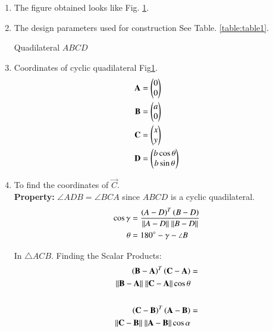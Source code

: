 \renewcommand{\theequation}{\theenumi}
\begin{enumerate}[label=\thesection.\arabic*.,ref=\thesection.\theenumi]

\begin{figure}[!ht]
\centering
\resizebox{\columnwidth}{!}{}
\caption{Cyclic quadilateral by Latex-Tikz}
\label{fig:cyclic_quad}	
\end{figure}

\item The figure obtained looks like Fig. \ref{fig:cyclic_quad}.\\ 

\item The design parameters used for construction See Table. \ref{table:table1}.
\begin{table}[ht!]
\centering

\caption{Quadilateral $ABCD$}
\label{table:table1}	
\end{table} 

\item Coordinates of cyclic quadilateral Fig\ref{fig:cyclic_quad}. \\
\begin{align}
\mathbf{A} &=\begin{pmatrix}0\\0\end{pmatrix} \label{eq:constr_a}\\
\mathbf{B} &=\begin{pmatrix}a\\0\end{pmatrix} \label{eq:constr_b}\\
\mathbf{C} &=\begin{pmatrix}x\\y\end{pmatrix} \label{eq:constr_c}\\
\mathbf{D} &= \begin{pmatrix}b\cos{\theta}\\b\sin{\theta}\end{pmatrix}\label{eq:constr_d}
\end{align}

\item To find the coordinates of $\vec{C}$. \\
\textbf{Property:} $\angle{ADB} = \angle{BCA}$ since $ABCD$ is a cyclic quadilateral.
\begin{align}
\cos{\gamma} &= \frac{\left(A-D\right)^T\left(B-D\right)}{\| A -D \| \ \|B-D\|} \\
\theta &= 180\degree - \gamma - \angle B
\end{align}

In $\triangle ACB$. Finding the Scalar Products:
\begin{align}
\begin{split}\label{eq:scalar1}
\left(\mathbf{B} - \mathbf{A}\right)^T\left(\mathbf{C}-\mathbf{A}\right) &= \\ \|\mathbf{B} - \mathbf{A}\|
\ \| \mathbf{C}-\mathbf{A} \| \cos{\theta}
\end{split}\\ \nonumber\\
\begin{split}\label{eq:scalar2}
\left(\mathbf{C} - \mathbf{B}\right)^T\left(\mathbf{A}-\mathbf{B}\right) &= \\ 
\|\mathbf{C} - \mathbf{B}\|\ \| \mathbf{A}-\mathbf{B} \| \cos{\alpha}
\end{split}
\end{align}


\end{enumerate}
